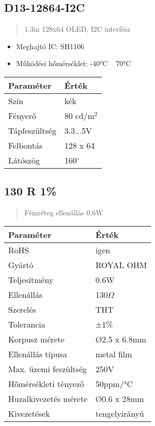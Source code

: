 \subsection{D13-12864-I2C}
\begin{quote}
    1.3in 128x64 OLED, I2C interfész
\end{quote}

\begin{itemize}
    \item Meghajtó IC: SH1106
    \item Működési hőmérséklet: -40°C ~ 70°C
\end{itemize}

{
    \small
    \noindent
    \begin{tabularx}{\textwidth}{@{}lX@{}}
    \toprule
    \textbf{Paraméter} & \textbf{Érték} \\
    \midrule
    Szín & kék \\
    Fényerő & 80 cd/m\(^2\) \\
    Tápfeszültség & 3.3...5V \\
    Felbontás & 128 x 64 \\
    Látószög & 160\(^{\circ}\) \\
    \bottomrule
    \end{tabularx}
}

\clearpage
\subsection{130 R 1\%}
\begin{quote}
    Fémréteg ellenállás 0,6W
\end{quote}


{
    \small
    \noindent
    \begin{tabularx}{\textwidth}{@{}lX@{}}
    \toprule
    \textbf{Paraméter} & \textbf{Érték} \\
    \midrule
    RoHS & igen \\
    Gyártó & ROYAL OHM \\
    Teljesítmény & 0.6W \\
    Ellenállás & 130\(\Omega\) \\
    Szerelés & THT \\
    Tolerancia & ±1\% \\
    Korpusz mérete & Ø2.5 x 6.8mm \\
    Ellenállás típusa & metal film \\
    Max. üzemi feszültség & 250V \\
    Hőmérsékleti tényező & 50ppm/°C \\
    Huzalkivezetés mérete & Ø0.6 x 28mm \\
    Kivezetések & tengelyirányú \\
    \bottomrule
    \end{tabularx}
}